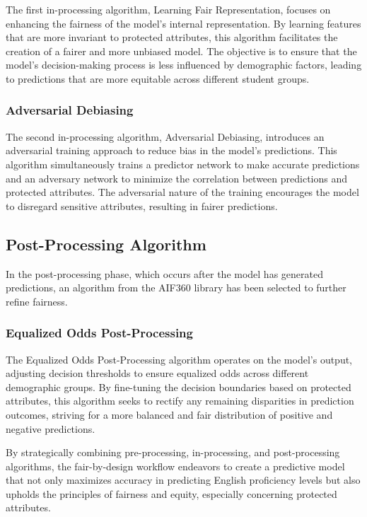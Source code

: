 \documentclass[12pt,a4paper,openright,twoside]{book}
\begin{document}
The first in-processing algorithm, Learning Fair Representation, focuses on enhancing the fairness of the model's internal representation. By learning features that are more invariant to protected attributes, this algorithm facilitates the creation of a fairer and more unbiased model. The objective is to ensure that the model's decision-making process is less influenced by demographic factors, leading to predictions that are more equitable across different student groups.

\subsubsection{Adversarial Debiasing}

The second in-processing algorithm, Adversarial Debiasing, introduces an adversarial training approach to reduce bias in the model's predictions. This algorithm simultaneously trains a predictor network to make accurate predictions and an adversary network to minimize the correlation between predictions and protected attributes. The adversarial nature of the training encourages the model to disregard sensitive attributes, resulting in fairer predictions.

\subsection{Post-Processing Algorithm}

In the post-processing phase, which occurs after the model has generated predictions, an algorithm from the AIF360 library has been selected to further refine fairness.

\subsubsection{Equalized Odds Post-Processing}

The Equalized Odds Post-Processing algorithm operates on the model's output, adjusting decision thresholds to ensure equalized odds across different demographic groups. By fine-tuning the decision boundaries based on protected attributes, this algorithm seeks to rectify any remaining disparities in prediction outcomes, striving for a more balanced and fair distribution of positive and negative predictions.

By strategically combining pre-processing, in-processing, and post-processing algorithms, the fair-by-design workflow endeavors to create a predictive model that not only maximizes accuracy in predicting English proficiency levels but also upholds the principles of fairness and equity, especially concerning protected attributes.
\end{document}
